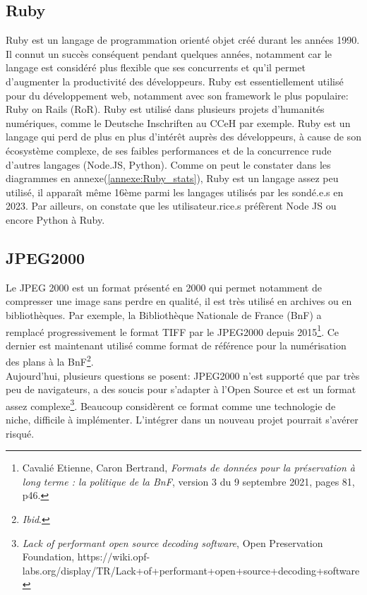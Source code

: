     \subsection{Ruby}

Ruby est un langage de programmation orienté objet créé durant les années 1990. Il connut un succès conséquent pendant quelques années, notamment car le langage  est considéré plus flexible que ses concurrents et qu’il permet d’augmenter la productivité des développeurs. Ruby est essentiellement utilisé pour du développement web, notamment avec  son framework le plus populaire: Ruby on Rails (RoR). Ruby est utilisé dans plusieurs projets d’humanités numériques, comme le Deutsche Inschriften au CCeH par exemple.
Ruby est un langage qui perd de plus en plus d’intérêt auprès des développeurs, à cause de son écosystème complexe, de ses faibles performances et de la concurrence rude d'autres langages (Node.JS, Python). 
Comme on peut le constater dans les diagrammes en annexe(\ref{annexe:Ruby_stats}), Ruby est un langage assez peu utilisé, il apparaît même 16ème parmi les langages utilisés par les sondé.e.s en 2023. Par ailleurs, on constate que les utilisateur.rice.s préfèrent Node JS ou encore Python à Ruby. 


    
    \subsection{JPEG2000}

Le JPEG 2000 est un format présenté en 2000 qui permet notamment de compresser une image sans perdre en qualité, il est très utilisé en archives ou en bibliothèques. Par exemple, la Bibliothèque Nationale de France (BnF) a remplacé progressivement le format TIFF par le JPEG2000 depuis 2015\footnote{Cavalié Etienne, Caron Bertrand, \textit{Formats de données pour la préservation à long terme : la politique de la BnF}, version 3 du 9 septembre 2021, pages 81, p46.}. Ce dernier est maintenant utilisé comme format de référence pour la numérisation des plans à la BnF\footnote{\textit{Ibid}.}.\\
Aujourd’hui, plusieurs questions se posent: JPEG2000 n’est supporté que par très peu de navigateurs, a des soucis pour s’adapter à l'Open Source et est un format assez complexe\footnote{\textit{Lack of performant open source decoding software}, Open Preservation Foundation, https://wiki.opf-labs.org/display/TR/Lack+of+performant+open+source+decoding+software }. Beaucoup considèrent ce format comme une technologie de niche, difficile à implémenter. L’intégrer dans un nouveau projet pourrait s’avérer risqué.\\

